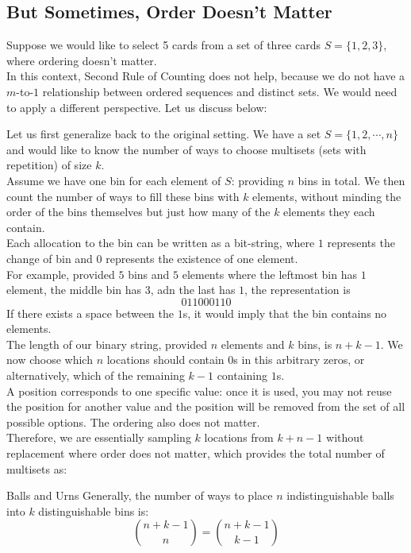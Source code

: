 \subsection{But Sometimes, Order Doesn't Matter}
Suppose we would like to select 5 cards from a set of three cards $S = \{1, 2, 3\}$, where ordering doesn't matter. \\
In this context, Second Rule of Counting does not help, because we do not have a $m$-to-$1$ relationship between ordered sequences and distinct sets. We would need to apply a different perspective. Let us discuss below:

Let us first generalize back to the original setting. We have a set $S = \{1, 2, \cdots, n\}$ and would like to know the number of ways to choose multisets (sets with repetition) of size $k$. \\
Assume we have one bin for each element of $S$: providing $n$ bins in total. We then count the number of ways to fill these bins with $k$ elements, without minding the order of the bins themselves but just how many of the $k$ elements they each contain. \\
Each allocation to the bin can be written as a bit-string, where $1$ represents the change of bin and $0$ represents the existence of one element. \\
For example, provided $5$ bins and $5$ elements where the leftmost bin has $1$ element, the middle bin has $3$, adn the last has $1$, the representation is
\[01 10001 10\]
If there exists a space between the $1$s, it would imply that the bin contains no elements. \\
The length of our binary string, provided $n$ elements and $k$ bins, is $n + k - 1$. We now choose which $n$ locations should contain $0$s in this arbitrary zeros, or alternatively, which of the remaining $k-1$ containing $1$s. \\
A position corresponds to one specific value: once it is used, you may not reuse the position for another value and the position will be removed from the set of all possible options. The ordering also does not matter. \\
Therefore, we are essentially sampling $k$ locations from $k + n - 1$ without replacement where order does not matter, which provides the total number of multisets as:
\begin{ln-theorem}{Balls and Urns}{}
    Generally, the number of ways to place $n$ indistinguishable balls into $k$ distinguishable bins is:
    \[\binom{n + k - 1}{n} = \binom{n + k - 1}{k - 1}\]
\end{ln-theorem}
